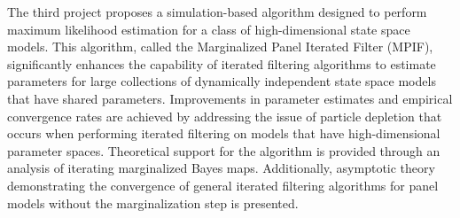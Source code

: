 The third project proposes a simulation-based algorithm designed to perform maximum likelihood estimation for a class of high-dimensional state space models.
This algorithm, called the Marginalized Panel Iterated Filter (MPIF), significantly enhances the capability of iterated filtering algorithms to estimate parameters for large collections of dynamically independent state space models that have shared parameters.
Improvements in parameter estimates and empirical convergence rates are achieved by addressing the issue of particle depletion that occurs when performing iterated filtering on models that have high-dimensional parameter spaces.
Theoretical support for the algorithm is provided through an analysis of iterating marginalized Bayes maps.
Additionally, asymptotic theory demonstrating the convergence of general iterated filtering algorithms for panel models without the marginalization step is presented. 
